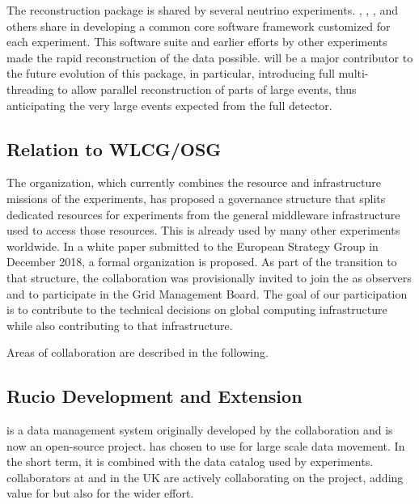 The \cite{Snider:2017wjd} reconstruction package is shared by several  neutrino experiments.  , , , and others share in developing a common core software framework customized for each experiment. This software suite and earlier efforts by other experiments made the rapid reconstruction of the  data possible.   will be a major contributor to  the future evolution of this package, in particular, introducing full multi-threading to allow parallel reconstruction of parts of large events, thus anticipating the very large events expected from the full detector. 

\subsection{Relation to WLCG/OSG}
The  \cite{Bird:2014ctt} organization, which currently combines the resource and infrastructure missions of the  experiments, has proposed a governance structure that splits dedicated resources for  experiments from the general middleware infrastructure used to access those resources.  This  is already used by many other experiments worldwide.  In a white paper submitted to the European Strategy Group in December 2018\cite{bib:BirdEUStrategy}, a formal  organization is proposed. As part of the transition to that structure, the  collaboration was provisionally invited to join the  as observers and to participate in the Grid Management Board. The goal of our participation is to contribute to the technical decisions on global computing infrastructure while also contributing to that infrastructure. 

Areas of collaboration are described in the following. 

\subsection{Rucio Development and Extension}

 \cite{Barisits:2019fyl}
is a data management system originally developed by the  collaboration and is now an open-source project.   has chosen to use  for large scale data movement.  In the short term, it is combined with the  data catalog used by  experiments.   collaborators at  and in the UK are actively collaborating on the  project, adding value for  but also for the wider effort.


